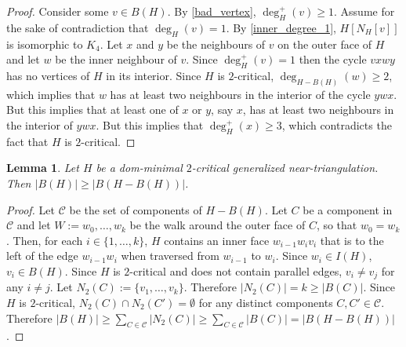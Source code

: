 \documentclass[12pt]{article}
\newtheorem{obs}{Observation}
\newtheorem{lem}{Lemma}
\theoremstyle{definition}
\begin{document}
\begin{proof}
  Consider some $v\in B(H)$. By \cref{bad_vertex}, $\deg^+_H(v)\ge 1$. Assume for the sake of contradiction that $\deg_H(v)=1$. By \cref{inner_degree_1}, $H[N_H[v]]$ is isomorphic to $K_4$. Let $x$ and $y$ be the neighbours of $v$ on the outer face of $H$ and let $w$ be the inner neighbour of $v$. Since $\deg^+_H(v)=1$ then the cycle $vxwy$ has no vertices of $H$ in its interior.  Since $H$ is $2$-critical, $\deg_{H-B(H)}(w)\ge 2$, which implies that $w$ has at least two neighbours in the interior of the cycle $ywx$.  But this implies that at least one of $x$ or $y$, say $x$, has at least two neighbours in the interior of $ywx$.  But this implies that $\deg^+_H(x)\ge 3$, which contradicts the fact that $H$ is $2$-critical.
\end{proof}


\begin{lem}
  Let $H$ be a dom-minimal $2$-critical generalized near-triangulation.  Then $|B(H)|\ge |B(H-B(H))|$.
\end{lem}

\begin{proof}
  Let $\mathcal{C}$ be the set of components of $H-B(H)$.
  Let $C$ be a component in $\mathcal{C}$ and let $W:=w_0,\ldots,w_k$ be the walk around the outer face of $C$, so that $w_0=w_k$.  Then, for each $i\in\{1,\ldots,k\}$, $H$ contains an inner face $w_{i-1}w_iv_i$ that is to the left of the edge $w_{i-1}w_i$ when traversed from $w_{i-1}$ to $w_i$.  Since $w_i\in I(H)$, $v_i\in B(H)$.  Since $H$ is $2$-critical and does not contain parallel edges, $v_i\neq v_j$ for any $i\neq j$. Let $N_2(C):=\{v_1,\ldots,v_k\}$.  Therefore $|N_2(C)|= k\ge |B(C)|$. Since $H$ is $2$-critical, $N_2(C)\cap N_2(C')=\emptyset$ for any distinct components $C,C'\in\mathcal{C}$.  Therefore $|B(H)|\ge \sum_{C\in\mathcal{C}} |N_2(C)|\ge \sum_{C\in\mathcal{C}} |B(C)|=|B(H-B(H))|$.
\end{proof}


%


%
%
\end{document}
